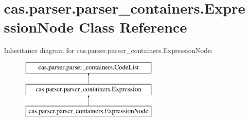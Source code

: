 \hypertarget{classcas_1_1parser_1_1parser__containers_1_1_expression_node}{\section{cas.\-parser.\-parser\-\_\-containers.\-Expression\-Node Class Reference}
\label{classcas_1_1parser_1_1parser__containers_1_1_expression_node}
}
Inheritance diagram for cas.\-parser.\-parser\-\_\-containers.\-Expression\-Node\-:\begin{figure}[H]
\begin{center}
\leavevmode
\includegraphics[height=3.000000cm]{classcas_1_1parser_1_1parser__containers_1_1_expression_node}
\end{center}
\end{figure}
